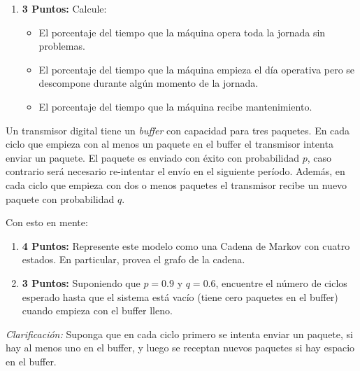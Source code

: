 \documentclass[ a4paper, twoside, 11pt]{article}
\begin{document}
\begin{problem}
\begin{enumerate}[label=\textbf{\alph*)}]
\begin{figure}[htb]
\centering
\def\svgwidth{0.9\columnwidth}

\end{figure}

\item \textbf{3 Puntos:} Calcule: 
\begin{itemize}
\item El porcentaje del tiempo que la m\'aquina opera toda la jornada sin problemas. 
\item El porcentaje del tiempo que la m\'aquina empieza el d\'ia operativa pero se descompone durante alg\'un momento de la jornada. 
\item El porcentaje del tiempo que la m\'aquina recibe mantenimiento. 
\end{itemize}
\end{enumerate}

\end{problem}
\fullskip

\begin{problem}
Un transmisor digital tiene un \emph{buffer} con capacidad para tres paquetes. \linebreak En cada ciclo que empieza con al menos un paquete en el buffer el transmisor intenta enviar un paquete. El paquete es enviado con \'exito con probabilidad $p$, caso contrario ser\'a necesario re-intentar el env\'io en el siguiente per\'iodo. Adem\'as, en cada ciclo que empieza con dos o menos paquetes el transmisor recibe un nuevo paquete con probabilidad $q$. 

Con esto en mente: 
\begin{enumerate}[label=\textbf{\alph*)}]
\item \textbf{4 Puntos:} Represente este modelo como una Cadena de Markov con cuatro estados. \linebreak En particular, provea el grafo de la cadena. 
\item \textbf{3 Puntos:} Suponiendo que $p = 0.9$ y $q = 0.6$, encuentre el n\'umero de ciclos esperado hasta que el sistema est\'a vac\'io (\ie tiene cero paquetes en el buffer) cuando empieza con el buffer lleno. 
\end{enumerate}

\emph{Clarificaci\'on:} Suponga que en cada ciclo primero se intenta enviar un paquete, si hay al menos uno en el buffer, y luego se receptan nuevos paquetes si hay espacio en el buffer. 

\end{problem}
\fullskip
\end{document}
